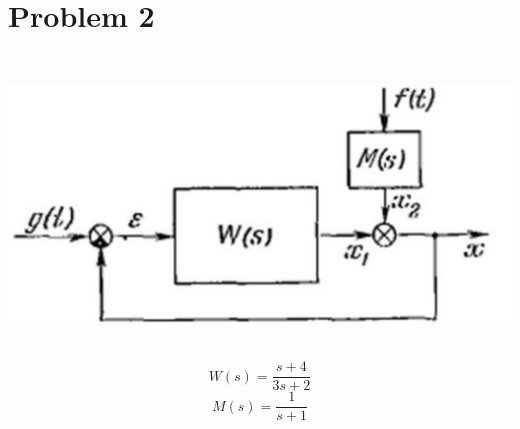 \documentclass[a4paper,11pt]{article}
\makeatletter
\newcommand{\problemquestion}[1]{\gdef\@problemquestion{#1}}%
\newcommand{\problemsolution}[1]{\gdef\@problemsolution{#1}}%
\theoremstyle{mytheor}
\makeatother
\begin{document}
\section*{Problem 2}

\includegraphics[width=15.3cm, height=8cm]{2.png}
$$W(s) = \frac{s+4}{3s+2}$$
$$M(s) = \frac{1}{s+1}$$
\begin{problem}
  \problemquestion{Find total transfer function for a closed-loop system.}
  \problemsolution{
      $$\Phi(s) = \frac{X}{G} = \frac{W(s)}{1 + W(s)}$$
      $$\Phi_f(s) = \frac{X}{F} = \frac{M(s)}{1 + W(s)}$$
      $$X = \Phi(s)G + \Phi_f(s)F = \frac{W(s)}{1 + W(s)}G + \frac{M(s)}{1 + W(s)}F$$
      $$X = \frac{\frac{s+4}{3s+2}}{1 + \frac{s+4}{3s+2}}G + \frac{\frac{1}{s+1}}{1 + \frac{s+4}{3s+2}}F$$
      $$X = \frac{s+4}{4s + 6}G + \frac{3s+2}{ (4s+6)(s+1)}F$$
      $$Answer: X = \frac{s+4}{4s + 6}G + \frac{3s+2}{4s^2 + 10s + 6}F$$
  }
\end{problem}
\end{document}
